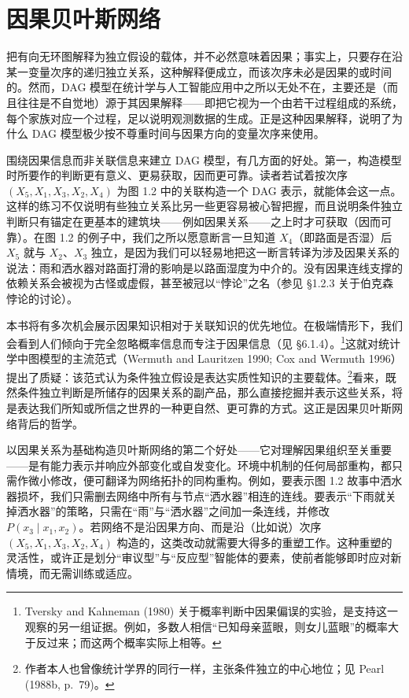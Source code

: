 \section{因果贝叶斯网络}

把有向无环图解释为独立假设的载体，并不必然意味着因果；事实上，只要存在沿某一变量次序的递归独立关系，这种解释便成立，而该次序未必是因果的或时间的。然而，DAG 模型在统计学与人工智能应用中之所以无处不在，主要还是（而且往往是不自觉地）源于其因果解释——即把它视为一个由若干过程组成的系统，每个家族对应一个过程，足以说明观测数据的生成。正是这种因果解释，说明了为什么 DAG 模型极少按不尊重时间与因果方向的变量次序来使用。

围绕因果信息而非关联信息来建立 DAG 模型，有几方面的好处。第一，构造模型时所要作的判断更有意义、更易获取，因而更可靠。读者若试着按次序 $(X_5,X_1,X_3,X_2,X_4)$ 为图 1.2 中的关联构造一个 DAG 表示，就能体会这一点。这样的练习不仅说明有些独立关系比另一些更容易被心智把握，而且说明条件独立判断只有锚定在更基本的建筑块——例如因果关系——之上时才可获取（因而可靠）。在图 1.2 的例子中，我们之所以愿意断言一旦知道 $X_4$（即路面是否湿）后 $X_5$ 就与 $X_2$、$X_3$ 独立，是因为我们可以轻易地把这一断言转译为涉及因果关系的说法：雨和洒水器对路面打滑的影响是以路面湿度为中介的。没有因果连线支撑的依赖关系会被视为古怪或虚假，甚至被冠以“悖论”之名（参见 \S 1.2.3 关于伯克森悖论的讨论）。

本书将有多次机会展示因果知识相对于关联知识的优先地位。在极端情形下，我们会看到人们倾向于完全忽略概率信息而专注于因果信息（见 \S 6.1.4）。\footnote{Tversky and Kahneman (1980) 关于概率判断中因果偏误的实验，是支持这一观察的另一组证据。例如，多数人相信“已知母亲蓝眼，则女儿蓝眼”的概率大于反过来；而这两个概率实际上相等。}这就对统计学中图模型的主流范式（Wermuth and Lauritzen 1990; Cox and Wermuth 1996）提出了质疑：该范式认为条件独立假设是表达实质性知识的主要载体。\footnote{作者本人也曾像统计学界的同行一样，主张条件独立的中心地位；见 Pearl (1988b, p.~79)。}看来，既然条件独立判断是所储存的因果关系的副产品，那么直接挖掘并表示这些关系，将是表达我们所知或所信之世界的一种更自然、更可靠的方式。这正是因果贝叶斯网络背后的哲学。

以因果关系为基础构造贝叶斯网络的第二个好处——它对理解因果组织至关重要——是有能力表示并响应外部变化或自发变化。环境中机制的任何局部重构，都只需作微小修改，便可翻译为网络拓扑的同构重构。例如，要表示图 1.2 故事中洒水器损坏，我们只需删去网络中所有与节点“洒水器”相连的连线。要表示“下雨就关掉洒水器”的策略，只需在“雨”与“洒水器”之间加一条连线，并修改 $P(x_3\mid x_1,x_2)$。若网络不是沿因果方向、而是沿（比如说）次序 $(X_5,X_1,X_3,X_2,X_4)$ 构造的，这类改动就需要大得多的重塑工作。这种重塑的灵活性，或许正是划分“审议型”与“反应型”智能体的要素，使前者能够即时应对新情境，而无需训练或适应。

